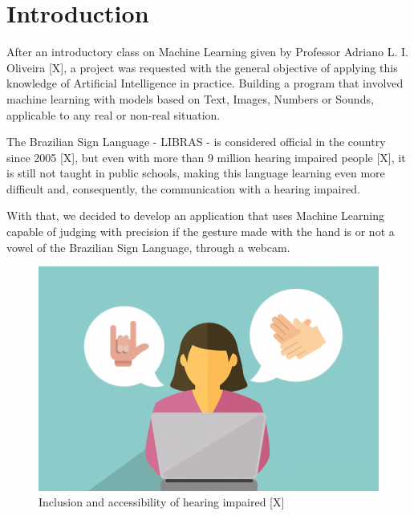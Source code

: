 \documentclass[a4paper, 12pt]{article}
\begin{document}
\newpage
\tableofcontents
\thispagestyle{empty}

\newpage
{}

\section{Introduction}

After an introductory class on Machine Learning given by Professor Adriano L. I. Oliveira [X], a project was requested with the general objective of applying this knowledge of Artificial Intelligence in practice. Building a program that involved machine learning with models based on Text, Images, Numbers or Sounds, applicable to any real or non-real situation.

The Brazilian Sign Language - LIBRAS - is considered official in the country since 2005 [X], but even with more than 9 million hearing impaired people [X], it is still not taught in public schools, making this language learning even more difficult and, consequently, the communication with a hearing impaired.

With that, we decided to develop an application that uses Machine Learning capable of judging with precision if the gesture made with the hand is or not a vowel of the Brazilian Sign Language, through a webcam.

\begin{figure}[!ht]
\centering
\includegraphics[scale=0.2]{img/inclusion.png}
\caption{Inclusion and accessibility of hearing impaired [X]}
\label{figure_1}
\end{figure}
\end{document}
